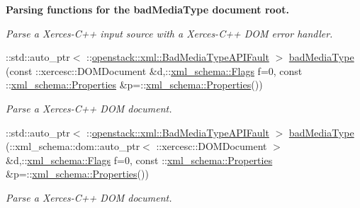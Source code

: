\begin{Indent}{\bf Parsing functions for the badMediaType document root.}
\begin{DoxyCompactItemize}
\begin{DoxyCompactList}\small\item\em Parse a Xerces-\/C++ input source with a Xerces-\/C++ DOM error handler. \item\end{DoxyCompactList}\item 
::std::auto\_\-ptr$<$ ::\hyperlink{classopenstack_1_1xml_1_1BadMediaTypeAPIFault}{openstack::xml::BadMediaTypeAPIFault} $>$ \hyperlink{namespaceopenstack_1_1xml_aabaf8b3da7e5a03acb74031e92070d8b}{badMediaType} (const ::xercesc::DOMDocument \&d,::\hyperlink{namespacexml__schema_affb4c227cbd9aa7453dd1dc5a1401943}{xml\_\-schema::Flags} f=0, const ::\hyperlink{namespacexml__schema_ad27ce19a7ee1d3b1064092648898f64c}{xml\_\-schema::Properties} \&p=::\hyperlink{namespacexml__schema_ad27ce19a7ee1d3b1064092648898f64c}{xml\_\-schema::Properties}())
\begin{DoxyCompactList}\small\item\em Parse a Xerces-\/C++ DOM document. \item\end{DoxyCompactList}\item 
::std::auto\_\-ptr$<$ ::\hyperlink{classopenstack_1_1xml_1_1BadMediaTypeAPIFault}{openstack::xml::BadMediaTypeAPIFault} $>$ \hyperlink{namespaceopenstack_1_1xml_abba039b703a05dcd4a9643150426a1f7}{badMediaType} (::xml\_\-schema::dom::auto\_\-ptr$<$ ::xercesc::DOMDocument $>$ \&d,::\hyperlink{namespacexml__schema_affb4c227cbd9aa7453dd1dc5a1401943}{xml\_\-schema::Flags} f=0, const ::\hyperlink{namespacexml__schema_ad27ce19a7ee1d3b1064092648898f64c}{xml\_\-schema::Properties} \&p=::\hyperlink{namespacexml__schema_ad27ce19a7ee1d3b1064092648898f64c}{xml\_\-schema::Properties}())
\begin{DoxyCompactList}\small\item\em Parse a Xerces-\/C++ DOM document. \item\end{DoxyCompactList}\end{DoxyCompactItemize}
\end{Indent}
